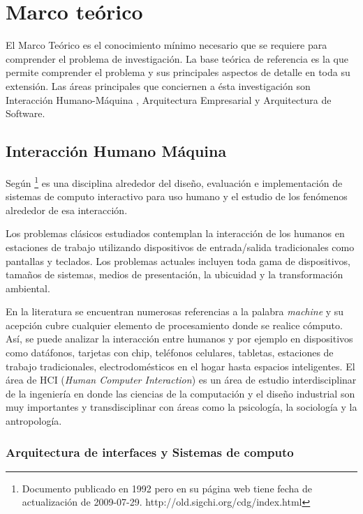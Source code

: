 
\chapter{Marco teórico}

El Marco Teórico es el conocimiento mínimo necesario que se requiere para comprender el problema de investigación. La base teórica de referencia es la que permite comprender el problema y sus principales aspectos de detalle en toda su extensión. Las áreas principales que conciernen a ésta investigación son Interacción Humano-Máquina \cite{sigchi1992curricula}, Arquitectura Empresarial y Arquitectura de Software.

\section{Interacción Humano Máquina}

Según \cite{sigchi1992curricula} \footnote{Documento publicado en 1992 pero en su página web tiene fecha de actualización de 2009-07-29. http://old.sigchi.org/cdg/index.html} es una disciplina alrededor del diseño, evaluación e implementación de sistemas de computo interactivo para uso humano y el estudio de los fenómenos alrededor de esa interacción. 

Los problemas clásicos estudiados contemplan la interacción de los humanos en estaciones de trabajo utilizando dispositivos de entrada/salida tradicionales como pantallas y teclados. Los problemas actuales incluyen toda gama de dispositivos, tamaños de sistemas, medios de presentación, la ubicuidad y la transformación ambiental. 

En la literatura se encuentran numerosas referencias a la palabra \textit{machine} y su acepción cubre cualquier elemento de procesamiento donde se realice cómputo. Así, se puede analizar la interacción entre humanos y por ejemplo en dispositivos como datáfonos, tarjetas con chip, teléfonos celulares, tabletas, estaciones de trabajo tradicionales, electrodomésticos en el hogar hasta espacios inteligentes. El área de HCI (\textit{Human Computer Interaction}) es un área de estudio interdisciplinar de la ingeniería en donde las ciencias de la computación y el diseño industrial son muy importantes y transdisciplinar con áreas como la psicología, la sociología y la antropología. 

\subsection{Arquitectura de interfaces y Sistemas de computo}

